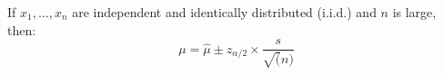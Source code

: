\begin{multicols}{3}
      \par If $x_1, \ldots, x_n$ are independent and identically distributed (i.i.d.) and $n$ is large, then:
        \[
          \mu = \hat{\mu} \pm z_{\alpha / 2} \times \frac{s}{\sqrt(n)}
        \]

\end{multicols}

\clearpage
